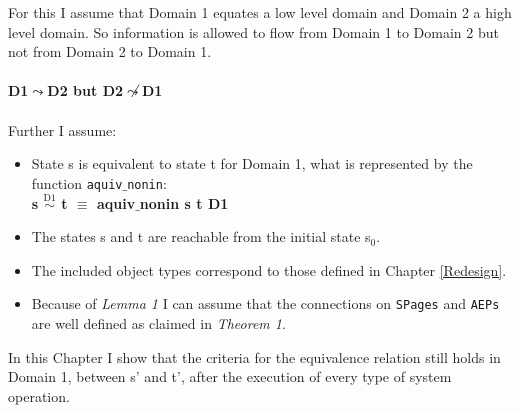 \documentclass[11pt,a4paper,twoside]{book}
\begin{document}
For this I assume that Domain 1 equates a low level domain and Domain 2 a high level domain. So  information is allowed to flow from Domain 1 to Domain 2 but not from Domain 2 to Domain 1. \\ \\
\textbf{D1$\leadsto$D2 but D2$\not\leadsto$D1} \\ \\
Further I assume:
\begin{itemize}
\item State s is equivalent to state t for Domain 1, what is represented by the function  \texttt{aquiv$\_$nonin}: \\ 
\textbf{s $\overset{\text{D1}}{\sim}$ t $\equiv$ aquiv$\_$nonin s t D1}	\\ 
\item The states s and t are reachable from the initial state s$_0$.
\item The included object types correspond to those defined in Chapter \ref{Redesign}.
\item Because of \textit{Lemma 1} I can assume that the connections on \texttt{SPages} and \texttt{AEPs} are well defined as claimed in \textit{Theorem 1}.
\end{itemize} 
In this Chapter I show that the criteria for the equivalence relation still holds in Domain 1, between s' and t', after the execution of every type of system operation. 

\clearpage

\clearpage
 
\clearpage

\clearpage

\clearpage

\clearpage

\clearpage
\end{document}
